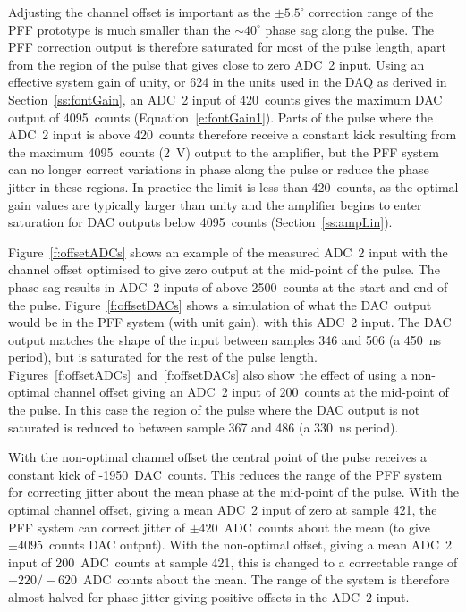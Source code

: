 Adjusting the channel offset is important as the \(\pm5.5^\circ\) correction range of the PFF prototype is much smaller than the \(\sim40^\circ\) phase sag along the pulse. The PFF correction output is therefore saturated for most of the pulse length, apart from the region  of the pulse that gives close to zero ADC~2 input. Using an effective system gain of unity, or 624 in the units used in the DAQ as derived in Section~\ref{ss:fontGain}, an ADC~2 input of 420~counts gives the maximum DAC output of 4095~counts (Equation~\ref{e:fontGain1}). Parts of the pulse where the ADC~2 input is above 420~counts therefore receive a constant kick resulting from the maximum 4095~counts (2~V) output to the amplifier, but the PFF system can no longer correct variations in phase along the pulse or reduce the phase jitter in these regions. In practice the limit is less than 420~counts, as the optimal gain values are typically larger than unity and the amplifier begins to enter saturation for DAC outputs below 4095~counts (Section~\ref{ss:ampLin}).

Figure~\ref{f:offsetADCs} shows an example of the measured ADC~2 input with the channel offset optimised to give zero output at the mid-point of the pulse. The phase sag results in ADC~2 inputs of above 2500~counts at the start and end of the pulse. Figure~\ref{f:offsetDACs} shows a simulation of what the DAC~output would be in the PFF system (with unit gain), with this ADC~2 input. The DAC output matches the shape of the input between samples 346 and 506 (a 450~ns period), but is saturated for the rest of the pulse length. Figures~\ref{f:offsetADCs}~and~\ref{f:offsetDACs} also show the effect of using a non-optimal channel offset giving an ADC~2 input of 200~counts at the mid-point of the pulse. In this case the region of the pulse where the DAC output is not saturated is reduced to between sample 367 and 486 (a 330~ns period). 

With the non-optimal channel offset the central point of the pulse receives a constant kick of -1950~DAC~counts. This reduces the range of the PFF system for correcting jitter about the mean phase at the mid-point of the pulse. With the optimal channel offset, giving a mean ADC~2 input of zero at sample 421, the PFF system can correct jitter of \(\pm420\)~ADC~counts about the mean (to give \(\pm4095\)~counts DAC output). With the non-optimal offset, giving a mean ADC~2 input of 200~ADC~counts at sample 421, this is changed to a correctable range of \(+220/-620\)~ADC~counts about the mean. The range of the system is therefore almost halved for phase jitter giving positive offsets in the ADC~2 input.

